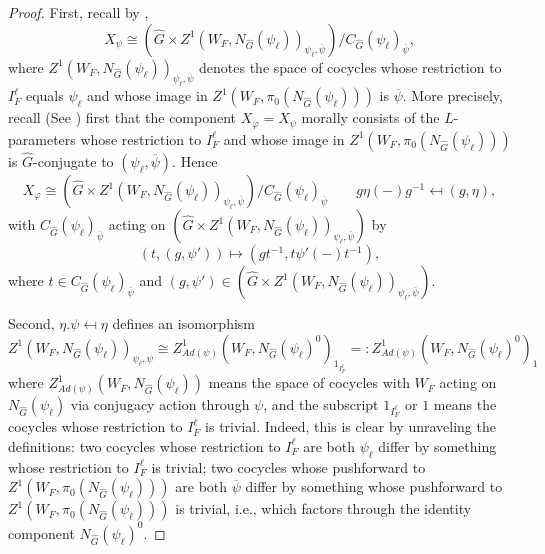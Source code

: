 \begin{theorem}
    \begin{proof}
    	First, recall by \cite[Subsection 4.6]{dat2022ihes},
    	$$X_{\psi} \cong \left(\hat{G} \times Z^1(W_F, N_{\hat{G}}(\psi_{\ell}))_{\psi_{\ell}, \overline{\psi}}\right)/C_{\hat{G}}(\psi_{\ell})_{\overline{\psi}},$$
    	where $Z^1(W_F, N_{\hat{G}}(\psi_{\ell}))_{\psi_{\ell}, \overline{\psi}}$  denotes the space of cocycles whose restriction to $I_F^{\ell}$ equals $\psi_{\ell}$ and whose image in $Z^1(W_F, \pi_0(N_{\hat{G}}(\psi_{\ell})))$ is $\overline{\psi}$. 
    	More precisely, recall (See \cite[Subsection 4.6]{dat2022ihes}) first that the component $X_{\varphi}=X_{\psi}$ morally consists of the $L$-parameters whose restriction to $I_F^{\ell}$ and whose image in $Z^1(W_F, \pi_0(N_{\hat{G}}(\psi_{\ell})))$ is $\hat{G}$-conjugate to $(\psi_{\ell}, \overline{\psi})$. Hence 
    	$$X_{\varphi} \cong (\hat{G} \times Z^1(W_F, N_{\hat{G}}(\psi_{\ell}))_{\psi_{\ell}, \overline{\psi}})/C_{\hat{G}}(\psi_{\ell})_{\overline{\psi}} \qquad g\eta(-)g^{-1} \mapsfrom (g, \eta),$$
    	with $C_{\hat{G}}(\psi_{\ell})_{\overline{\psi}}$ acting on $(\hat{G} \times Z^1(W_F, N_{\hat{G}}(\psi_{\ell}))_{\psi_{\ell}, \overline{\psi}})$ by 
    	$$(t, (g, \psi')) \mapsto (gt^{-1}, t\psi'(-)t^{-1}),$$
    	where $t \in C_{\hat{G}}(\psi_{\ell})_{\overline{\psi}}$ and $(g, \psi') \in (\hat{G} \times Z^1(W_F, N_{\hat{G}}(\psi_{\ell}))_{\psi_{\ell}, \overline{\psi}})$.
    	
    	Second, $\eta.\psi \mapsfrom \eta$ defines an isomorphism
    	$$Z^1(W_F, N_{\hat{G}}(\psi_{\ell}))_{\psi_{\ell}, \overline{\psi}} \cong Z^1_{Ad(\psi)}(W_F, N_{\hat{G}}(\psi_{\ell})^0)_{1_{I_F^{\ell}}}=:Z^1_{Ad(\psi)}(W_F, N_{\hat{G}}(\psi_{\ell})^0)_1$$
    	where $Z^1_{Ad(\psi)}(W_F, N_{\hat{G}}(\psi_{\ell}))$ means the space of cocycles with $W_F$ acting on $N_{\hat{G}}(\psi_{\ell})$ via conjugacy action through $\psi$, and the subscript $1_{I_F^{\ell}}$ or $1$ means the cocycles whose restriction to $I_F^{\ell}$ is trivial. 
    	Indeed, this is clear by unraveling the definitions: two cocycles whose restriction to $I_F^\ell$ are both $\psi_{\ell}$ differ by something whose restriction to $I_F^{\ell}$ is trivial; two cocycles whose pushforward to $Z^1(W_F, \pi_0(N_{\hat{G}}(\psi_{\ell})))$ are both $\overline{\psi}$ differ by something whose pushforward to $Z^1(W_F, \pi_0(N_{\hat{G}}(\psi_{\ell})))$ is trivial, i.e., which factors through the identity component $N_{\hat{G}}(\psi_{\ell})^0$.
    	

\end{proof}
\end{theorem}
